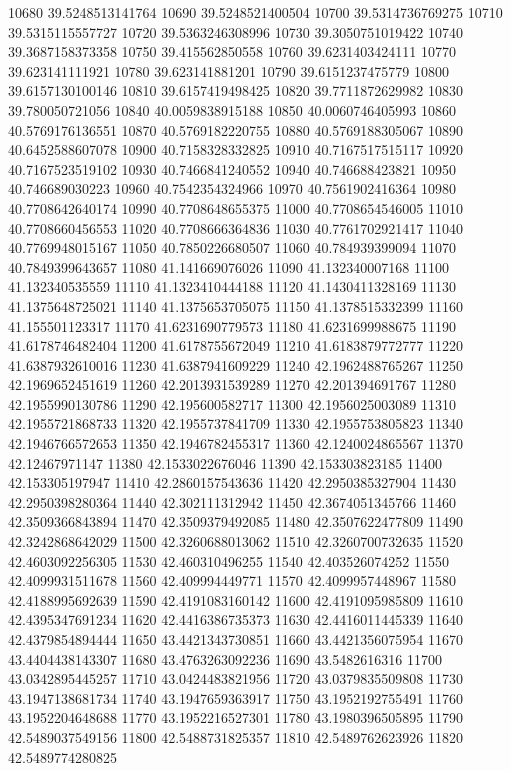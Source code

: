 {10680 39.5248513141764
10690 39.5248521400504
10700 39.5314736769275
10710 39.5315115557727
10720 39.5363246308996
10730 39.3050751019422
10740 39.3687158373358
10750 39.415562850558
10760 39.6231403424111
10770 39.623141111921
10780 39.623141881201
10790 39.6151237475779
10800 39.6157130100146
10810 39.6157419498425
10820 39.7711872629982
10830 39.780050721056
10840 40.0059838915188
10850 40.0060746405993
10860 40.5769176136551
10870 40.5769182220755
10880 40.5769188305067
10890 40.6452588607078
10900 40.7158328332825
10910 40.7167517515117
10920 40.7167523519102
10930 40.7466841240552
10940 40.746688423821
10950 40.746689030223
10960 40.7542354324966
10970 40.7561902416364
10980 40.7708642640174
10990 40.7708648655375
11000 40.7708654546005
11010 40.7708660456553
11020 40.7708666364836
11030 40.7761702921417
11040 40.7769948015167
11050 40.7850226680507
11060 40.784939399094
11070 40.7849399643657
11080 41.141669076026
11090 41.132340007168
11100 41.132340535559
11110 41.1323410444188
11120 41.1430411328169
11130 41.1375648725021
11140 41.1375653705075
11150 41.1378515332399
11160 41.155501123317
11170 41.6231690779573
11180 41.6231699988675
11190 41.6178746482404
11200 41.6178755672049
11210 41.6183879772777
11220 41.6387932610016
11230 41.6387941609229
11240 42.1962488765267
11250 42.1969652451619
11260 42.2013931539289
11270 42.201394691767
11280 42.1955990130786
11290 42.195600582717
11300 42.1956025003089
11310 42.1955721868733
11320 42.1955737841709
11330 42.1955753805823
11340 42.1946766572653
11350 42.1946782455317
11360 42.1240024865567
11370 42.12467971147
11380 42.1533022676046
11390 42.153303823185
11400 42.153305197947
11410 42.2860157543636
11420 42.2950385327904
11430 42.2950398280364
11440 42.302111312942
11450 42.3674051345766
11460 42.3509366843894
11470 42.3509379492085
11480 42.3507622477809
11490 42.3242868642029
11500 42.3260688013062
11510 42.3260700732635
11520 42.4603092256305
11530 42.460310496255
11540 42.403526074252
11550 42.4099931511678
11560 42.409994449771
11570 42.4099957448967
11580 42.4188995692639
11590 42.4191083160142
11600 42.4191095985809
11610 42.4395347691234
11620 42.4416386735373
11630 42.4416011445339
11640 42.4379854894444
11650 43.4421343730851
11660 43.4421356075954
11670 43.4404438143307
11680 43.4763263092236
11690 43.5482616316
11700 43.0342895445257
11710 43.0424483821956
11720 43.0379835509808
11730 43.1947138681734
11740 43.1947659363917
11750 43.1952192755491
11760 43.1952204648688
11770 43.1952216527301
11780 43.1980396505895
11790 42.5489037549156
11800 42.5488731825357
11810 42.5489762623926
11820 42.5489774280825
}
